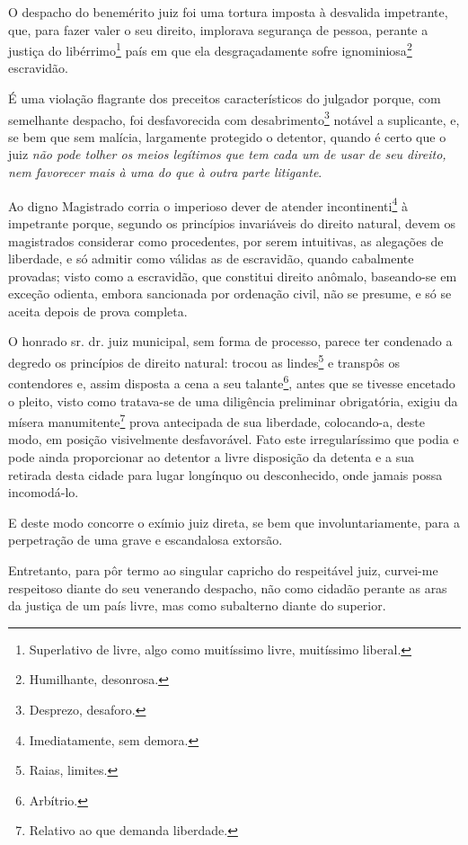 O despacho do benemérito juiz foi uma tortura imposta à desvalida
impetrante, que, para fazer valer o seu direito, implorava segurança de
pessoa, perante a justiça do libérrimo\footnote{Superlativo de livre,
  algo como muitíssimo livre, muitíssimo liberal.} país em que ela
desgraçadamente sofre ignominiosa\footnote{Humilhante, desonrosa.}
escravidão.

É uma violação flagrante dos preceitos característicos do julgador
porque, com semelhante despacho, foi desfavorecida com
desabrimento\footnote{Desprezo, desaforo.} notável a suplicante, e, se
bem que sem malícia, largamente protegido o detentor, quando é certo que
o juiz \emph{não pode tolher os meios legítimos que tem cada um de usar
de seu direito, nem favorecer mais à uma do que à outra parte
litigante}.

Ao digno Magistrado corria o imperioso dever de atender
incontinenti\footnote{Imediatamente, sem demora.} à impetrante porque,
segundo os princípios invariáveis do direito natural, devem os
magistrados considerar como procedentes, por serem intuitivas, as
alegações de liberdade, e só admitir como válidas as de escravidão,
quando cabalmente provadas; visto como a escravidão, que constitui
direito anômalo, baseando-se em exceção odienta, embora sancionada por
ordenação civil, não se presume, e só se aceita depois de prova
completa.

O honrado sr. dr. juiz municipal, sem forma de processo, parece ter
condenado a degredo os princípios de direito natural: trocou as
lindes\footnote{Raias, limites.} e transpôs os contendores e, assim
disposta a cena a seu talante\footnote{Arbítrio.}, antes que se
tivesse encetado o pleito, visto como tratava-se de uma diligência
preliminar obrigatória, exigiu da mísera manumitente\footnote{Relativo
  ao que demanda liberdade.} prova antecipada de sua liberdade,
colocando-a, deste modo, em posição visivelmente desfavorável. Fato este
irregularíssimo que podia e pode ainda proporcionar ao detentor a livre
disposição da detenta e a sua retirada desta cidade para lugar longínquo
ou desconhecido, onde jamais possa incomodá-lo.

E deste modo concorre o exímio juiz direta, se bem que
involuntariamente, para a perpetração de uma grave e escandalosa
extorsão.

Entretanto, para pôr termo ao singular capricho do respeitável juiz,
curvei-me respeitoso diante do seu venerando despacho, não como cidadão
perante as aras da justiça de um país livre, mas como subalterno diante
do superior.


